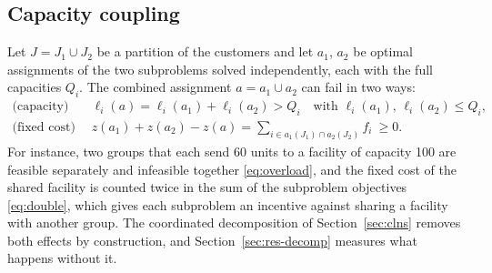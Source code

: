 \subsection{Capacity coupling}\label{sec:coupling}
Let $J=J_1\cup J_2$ be a partition of the customers and let $a_1$, $a_2$ be optimal assignments
of the two subproblems solved independently, each with the full capacities $Q_i$. The combined
assignment $a=a_1\cup a_2$ can fail in two ways:
\begin{align}
\text{(capacity)}\quad & \ell_i(a)=\ell_i(a_1)+\ell_i(a_2) > Q_i \quad\text{with }\ell_i(a_1),\,\ell_i(a_2)\le Q_i, \label{eq:overload}\\
\text{(fixed cost)}\quad & z(a_1)+z(a_2)-z(a)=\sum_{i\in a_1(J_1)\cap a_2(J_2)} f_i\ \ge 0.
\label{eq:double}
\end{align}
For instance, two groups that each send 60 units to a facility of capacity 100 are feasible
separately and infeasible together \eqref{eq:overload}, and the fixed cost of the shared facility
is counted twice in the sum of the subproblem objectives \eqref{eq:double}, which gives each subproblem an
incentive against sharing a facility with another group. The
coordinated decomposition of Section~\ref{sec:clns} removes both effects by construction, and
Section~\ref{sec:res-decomp} measures what happens without it.
